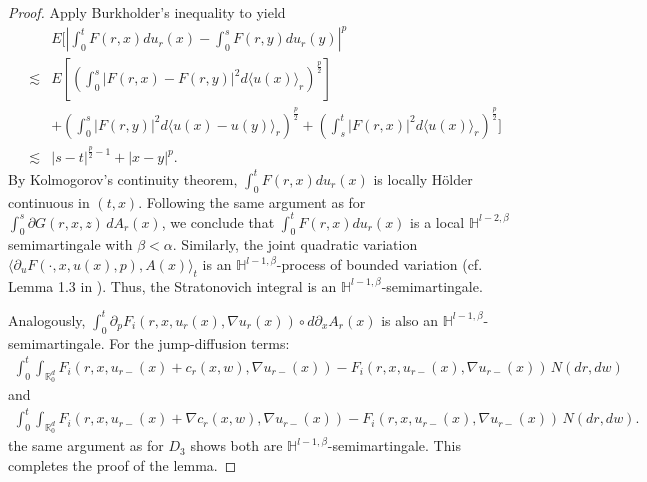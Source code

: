 \documentclass[12pt,oneside, reqno]{amsart}
\newcommand{\ce}{\begin{eqnarray*}}
\newcommand{\de}{\end{eqnarray*}}
\def\mH{{\mathbb H}}
\def\mR{{\mathbb R}}
\numberwithin{equation}{section}
\begin{document}
\begin{proof}
Apply	Burkholder's inequality to yield
\ce 
&&E\bigg[\left|\int_0^tF(r,x)du_r(x)-\int_0^sF(r,y)du_r(y)\right|^p\\
&\lesssim&E\left[\left(\int_0^s|F(r,x)-F(r,y)|^2d\langle u(x)\rangle_r\right)^{\frac{p}{2}}\right]\\
&&+\left(\int_0^s|F(r,y)|^2d\langle u(x)-u(y)\rangle_r\right)^{\frac{p}{2}}+\left(\int_s^t|F(r,x)|^2d\langle u(x)\rangle_r\right)^{\frac{p}{2}}\bigg]\\
&\lesssim&|s-t|^{\frac{p}{2}-1}+|x-y|^p.
\de 
By Kolmogorov's continuity theorem, $\int_0^tF(r,x)du_r(x)$ is locally H\"{o}lder continuous in $(t,x)$. Following the same argument as for  $\int_0^s \partial G(r,x,z) \,dA_r(x)$, we conclude that $\int_0^tF(r,x)du_r(x)$ is a 
 local $\mH^{l-2,\beta}$ semimartingale with $\beta<\alpha$. Similarly, the joint quadratic variation  $\langle \partial_u F(\cdot,x,u(x),p), A(x) \rangle_t$ is an $\mH^{l-1,\beta}$-process of bounded variation (cf. Lemma  1.3 in \cite{Kunita1984}). Thus, the Stratonovich integral is an $\mH^{l-1,\beta}$-semimartingale. 
 
 Analogously, $\int_0^t \partial_{p} F_i(r,x,u_r(x),\nabla u_r(x)) \circ d\partial_{x}A_r(x)$  is also an  $\mH^{l-1,\beta}$-semimartingale. For the jump-diffusion terms:
 \ce 
 \int_0^t\int_{\mR^d_0} F_i(r,x,u_{r-}(x)+c_r(x,w),\nabla u_{r-}(x))- F_i(r,x,u_{r-}(x),\nabla u_{r-}(x)) \,N(dr,dw)
 \de 
 and
 \ce 
 \int_0^t\int_{\mR^d_0} F_i(r,x,u_{r-}(x)+\nabla c_r(x,w),\nabla u_{r-}(x))- F_i(r,x,u_{r-}(x),\nabla u_{r-}(x)) \,N(dr,dw).
 \de 
the same argument as for  $D_3$ shows both are $\mH^{l-1,\beta}$-semimartingale. This completes the proof of the lemma.
\end{proof}
\end{document}
